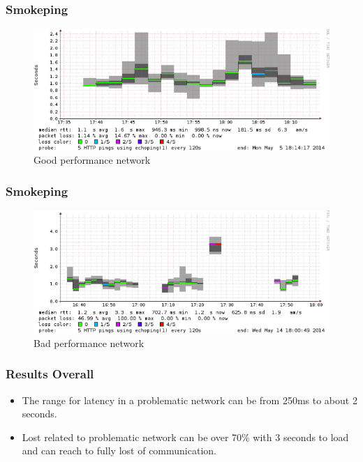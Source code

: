 \begin{frame}
	\frametitle{Smokeping}
	\begin{figure}[h!]
		\centering 
			\includegraphics[scale=0.35]{img/smoke_inf_good}
			\caption[Smokeping: Web requests with good performance]{Good performance network}
	\end{figure}%
\end{frame}
\begin{frame}
	\frametitle{Smokeping}
	\begin{figure}[h!]
			\centering 
			\includegraphics[scale=0.35]{img/smoke_inf_bad}
			\caption[Smokeping: Web requests with bad performance]{Bad performance network}
	\end{figure} 
\end{frame}
\begin{frame}
	\frametitle{Results Overall}
	\begin{block}{}
		\begin{itemize}
			\item The range for latency in a problematic network can be from 250ms to about 2 seconds.
			\item Lost related to problematic network can be over 70\% with 3 seconds to load and can reach to fully lost of communication.
		\end{itemize}
	\end{block}
\end{frame}

